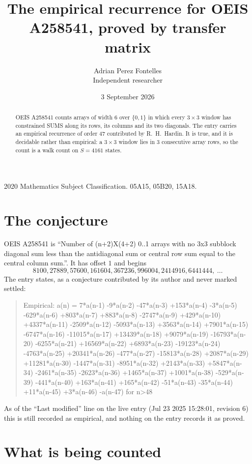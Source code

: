 \documentclass[11pt,a4paper]{article}
\title{The empirical recurrence for OEIS A258541, proved by transfer matrix}
\author{Adrian Perez Fontelles\\ \small Independent researcher}
\date{3 September 2026}
\theoremstyle{plain}
\theoremstyle{definition}
\begin{document}
\maketitle

\begin{abstract}
OEIS A258541 counts arrays of width $6$ over $\{0,1\}$ in which every $3\times3$ window has
constrained SUMS along its rows, its columns and its two diagonals. The entry carries an
empirical recurrence of order $47$ contributed by R.~H.~Hardin. It is true, and it is
decidable rather than empirical: a $3\times3$ window lies in $3$ consecutive array rows,
so the count is a walk count on $S=4161$ states.
\end{abstract}

\noindent\small 2020 Mathematics Subject Classification. 05A15, 05B20, 15A18.\normalsize

\section{The conjecture}

OEIS A258541 is ``Number of (n+2)X(4+2) 0..1 arrays with no 3x3 subblock diagonal sum less than the antidiagonal sum or central row sum equal to the central column sum.''. It has offset $1$ and begins
\[
8100, 27889, 57600, 161604, 367236, 996004, 2414916, 6441444,\ \dots
\]
The entry states, as a conjecture contributed by its author and never marked settled:
\begin{quote}
Empirical: a(n) = 7*a(n-1) -9*a(n-2) -47*a(n-3) +153*a(n-4) -3*a(n-5) -629*a(n-6) +803*a(n-7) +883*a(n-8) -2747*a(n-9) +429*a(n-10) +4337*a(n-11) -2509*a(n-12) -5093*a(n-13) +3563*a(n-14) +7901*a(n-15) -6747*a(n-16) -11015*a(n-17) +13439*a(n-18) +9079*a(n-19) -16793*a(n-20) -6255*a(n-21) +16569*a(n-22) +6893*a(n-23) -19123*a(n-24) -4763*a(n-25) +20341*a(n-26) -477*a(n-27) -15813*a(n-28) +2087*a(n-29) +11281*a(n-30) -1447*a(n-31) -8951*a(n-32) +2143*a(n-33) +5847*a(n-34) -2461*a(n-35) -2623*a(n-36) +1465*a(n-37) +1001*a(n-38) -529*a(n-39) -441*a(n-40) +163*a(n-41) +165*a(n-42) -51*a(n-43) -35*a(n-44) +11*a(n-45) +3*a(n-46) -a(n-47) for n>48
\end{quote}
As of the ``Last modified'' line on the live entry (Jul 23 2025 15:28:01, revision 6) this is still
recorded as empirical, and nothing on the entry records it as proved.

\section{What is being counted}
\end{document}
